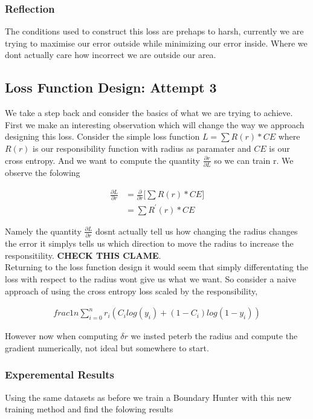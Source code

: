 \documentclass{article}
\begin{document}
\subsubsection{Reflection}
The conditions used to construct this loss are prehaps to harsh, currently we are trying to maximise our error outside while minimizing our error inside. Where we dont actually care how incorrect we are outside our area.

\subsection{Loss Function Design: Attempt 3}
We take a step back and consider the basics of what we are trying to achieve. First we make an interesting observation which will change the way we approach designing this loss. Consider the simple loss function $L =\sum R(r) * CE$ where $R(r)$ is our responsibility function with radius as paramater and $CE$ is our cross entropy. And we want to compute the quantity $\frac{\partial r}{\partial L}$ so we can train r. We observe the folowing

\begin{align*}
\frac{\partial L}{\partial r} &= \frac{\partial}{\partial r} \big[ \sum R(r) * CE \big] \\
&= \sum R^{'} (r) * CE
\end{align*} 

Namely the quantity $\frac{\partial L}{\partial r}$ dosnt actually tell us how changing the radius changes the error it simplys tells us which direction to move the radius to increase the responsitility. \textbf{CHECK THIS CLAME}.\\

Returning to the loss function design it would seem that simply differentating the loss with respect to the radius wont give us what we want. So consider a naive approach of using the cross entropy loss scaled by the responsibility,

\begin{align}
frac{1}{n} \sum_{i=0}^n r_i(C_i log(y_i) + (1-C_i)log(1-y_i))
\end{align}

However now when computing $\delta r$ we insted peterb the radius and compute the gradient numerically, not ideal but somewhere to start.

\subsubsection{Experemental Results}
Using the same datasets as before we train a Boundary Hunter with this new training method and find the folowing results
\end{document}
